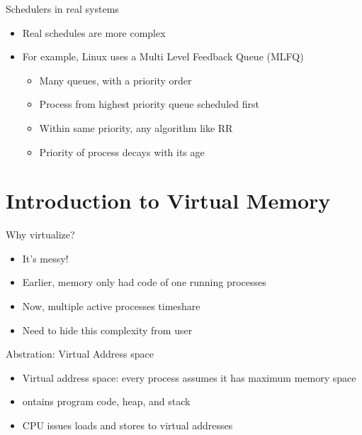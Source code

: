 \documentclass[12pt]{article}
\begin{document}
Schedulers in real systems
\begin{itemize}
    \item Real schedules are more complex
    \item For example, Linux uses a Multi Level Feedback Queue (MLFQ)
    \begin{itemize}
        \item Many queues, with a priority order
        \item Process from highest priority queue scheduled first
        \item Within same priority, any algorithm like RR
        \item Priority of process decays with its age
    \end{itemize}
\end{itemize}

\section{Introduction to Virtual Memory}

Why virtualize?
\begin{itemize}
    \item It's messy!
    \item Earlier, memory only had code of one running processes
    \item Now, multiple active processes timeshare
    \item Need to hide this complexity from user
\end{itemize}

Abstration: Virtual Address space
\begin{itemize}
    \item Virtual address space: every process assumes it has maximum memory space
    \item ontains program code, heap, and stack
    \item CPU issues loads and stores to virtual addresses
\end{itemize}
\end{document}
